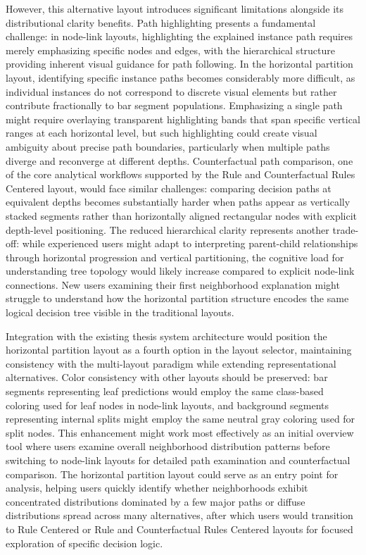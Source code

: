 However, this alternative layout introduces significant limitations alongside its distributional clarity benefits. Path highlighting presents a fundamental challenge: in node-link layouts, highlighting the explained instance path requires merely emphasizing specific nodes and edges, with the hierarchical structure providing inherent visual guidance for path following. In the horizontal partition layout, identifying specific instance paths becomes considerably more difficult, as individual instances do not correspond to discrete visual elements but rather contribute fractionally to bar segment populations. Emphasizing a single path might require overlaying transparent highlighting bands that span specific vertical ranges at each horizontal level, but such highlighting could create visual ambiguity about precise path boundaries, particularly when multiple paths diverge and reconverge at different depths. Counterfactual path comparison, one of the core analytical workflows supported by the Rule and Counterfactual Rules Centered layout, would face similar challenges: comparing decision paths at equivalent depths becomes substantially harder when paths appear as vertically stacked segments rather than horizontally aligned rectangular nodes with explicit depth-level positioning. The reduced hierarchical clarity represents another trade-off: while experienced users might adapt to interpreting parent-child relationships through horizontal progression and vertical partitioning, the cognitive load for understanding tree topology would likely increase compared to explicit node-link connections. New users examining their first neighborhood explanation might struggle to understand how the horizontal partition structure encodes the same logical decision tree visible in the traditional layouts.

Integration with the existing thesis system architecture would position the horizontal partition layout as a fourth option in the layout selector, maintaining consistency with the multi-layout paradigm while extending representational alternatives. Color consistency with other layouts should be preserved: bar segments representing leaf predictions would employ the same class-based coloring used for leaf nodes in node-link layouts, and background segments representing internal splits might employ the same neutral gray coloring used for split nodes. 
This enhancement might work most effectively as an initial overview tool where users examine overall neighborhood distribution patterns before switching to node-link layouts for detailed path examination and counterfactual comparison. The horizontal partition layout could serve as an entry point for analysis, helping users quickly identify whether neighborhoods exhibit concentrated distributions dominated by a few major paths or diffuse distributions spread across many alternatives, after which users would transition to Rule Centered or Rule and Counterfactual Rules Centered layouts for focused exploration of specific decision logic.

